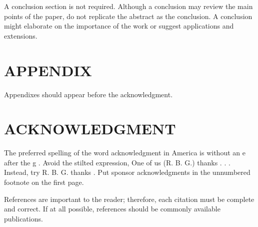 \documentclass[letterpaper, 10 pt, conference]{ieeeconf}  %
\begin{document}
A conclusion section is not required. Although a conclusion may review the main points of the paper, do not replicate the abstract as the conclusion. A conclusion might elaborate on the importance of the work or suggest applications and extensions. 

\addtolength{\textheight}{-12cm}   %







\section*{APPENDIX}

Appendixes should appear before the acknowledgment.

\section*{ACKNOWLEDGMENT}

The preferred spelling of the word  acknowledgment  in America is without an  e  after the  g . Avoid the stilted expression,  One of us (R. B. G.) thanks . . .   Instead, try  R. B. G. thanks . Put sponsor acknowledgments in the unnumbered footnote on the first page.




References are important to the reader; therefore, each citation must be complete and correct. If at all possible, references should be commonly available publications.
\end{document}
